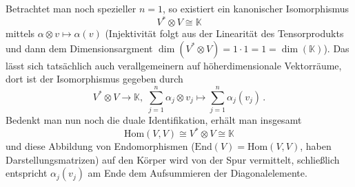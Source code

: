 \documentclass[../H_Analysis_main.tex]{subfiles}
\begin{document}
\begin{bsp}
Betrachtet man noch spezieller $n = 1$, so existiert ein kanonischer Isomorphismus
\begin{equation}
V^* \otimes V \cong \mathbb{K}
\end{equation}
mittels $\alpha \otimes v \mapsto \alpha(v)$ (Injektivität folgt aus der Linearität des Tensorprodukts und dann dem Dimensionsargment $\dim(V^* \otimes V) = 1 \cdot 1 = 1 = \dim(\mathbb{K})$). Das lässt sich tatsächlich auch verallgemeinern auf höherdimensionale Vektorräume, dort ist der Isomorphismus gegeben durch
\begin{equation}
V^* \otimes V \rightarrow \mathbb{K}, \; \sum_{j = 1}^n \alpha_j \otimes v_j \mapsto \sum_{j = 1}^n \alpha_j(v_j) \, .
\end{equation}
Bedenkt man nun noch die duale Identifikation, erhält man insgesamt
\begin{equation*}
\text{Hom}(V, V) \cong V^* \otimes V \cong \mathbb{K}
\end{equation*}
und diese Abbildung von Endomorphismen ($\text{End}(V) = \text{Hom}(V, V)$, haben Darstellungsmatrizen) auf den Körper wird von der Spur vermittelt, schließlich entspricht $\alpha_j(v_j)$ am Ende dem Aufsummieren der Diagonalelemente.
%
\end{bsp}
\end{document}
